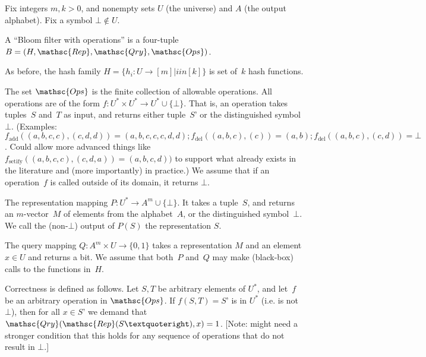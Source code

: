 
Fix integers $m,k > 0$, and nonempty sets $U$ (the universe) and $A$ (the output alphabet).  Fix a symbol $\bot \not\in U$.  

A “Bloom filter with operations” is a four-tuple  $B=(H,\mathsc{Rep},\mathsc{Qry}, \mathsc{Ops})$.  

As before, the hash family $H = \{h_i : U \rightarrow [m]  | i in [k] \}$ is  set of~$k$ hash functions.  

The set $\mathsc{Ops}$ is the finite collection of allowable operations.  All operations are of the form 
$f: U^* \times U^* \rightarrow U^* \cup \{\bot\}$.  That is, an operation takes tuples~$S$ and~$T$ as input, and returns either tuple~$S’$ or the distinguished symbol $\bot$.  (Examples: $f_{\mathrm{add}}((a,b,c,c),(c,d,d)) = (a,b,c,c,c,d,d); f_{\mathrm{del}}((a,b,c),(c))=(a,b); f_{\mathrm{del}}((a,b,c),(c,d)) = \bot$.  Could allow more advanced things like $f_{\mathrm{setify}}((a,b,c,c),(c,d,a)) = (a,b,c,d))$ to support what already exists in the literature and (more importantly) in practice.)  We assume that if an operation~$f$ is called outside of its domain, it returns $\bot$.

The representation mapping $P: U^* \rightarrow A^m \cup \{\bot\}$.  It takes a tuple~$S$, and returns an $m$-vector~$M$ of elements from the alphabet~$A$, or the distinguished symbol~$\bot$.  We call the (non-$\bot$) output of $P(S)$ the representation $S$. 

The query mapping $Q: A^m \times U \rightarrow \{0,1\}$ takes a representation $M$ and an element $x \in U$ and returns a bit.  We assume that both~$P$ and~$Q$ may make (black-box) calls to the functions in~$H$.  

Correctness is defined as follows.  Let $S,T$ be arbitrary elements of $U^*$, and let~$f$ be an arbitrary operation in $\mathsc{Ops}$.  If $f(S,T) = S’$ is in $U^*$ (i.e. is not $\bot$), then for all $x \in S’$ we demand that $\mathsc{Qry}(\mathsc{Rep}(S’),x)=1$. [Note: might need a stronger condition that this holds for any sequence of operations that do not result in $\bot$.]

